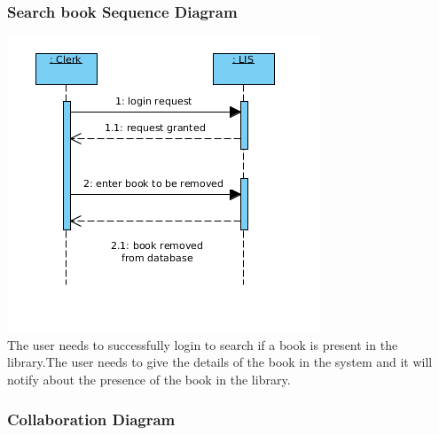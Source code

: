 \documentclass[a4paper]{article}
\begin{document}
\subsubsection*{Search book Sequence Diagram}
\includegraphics[scale=0.50]{images/seqDiagBookRemoval.png}
\\
The user needs to successfully login to search if a book is present in the library.The user needs to give the details of the book in the system and it will notify about the presence of the book in the library.
\\

\subsubsection{Collaboration Diagram}
\end{document}
